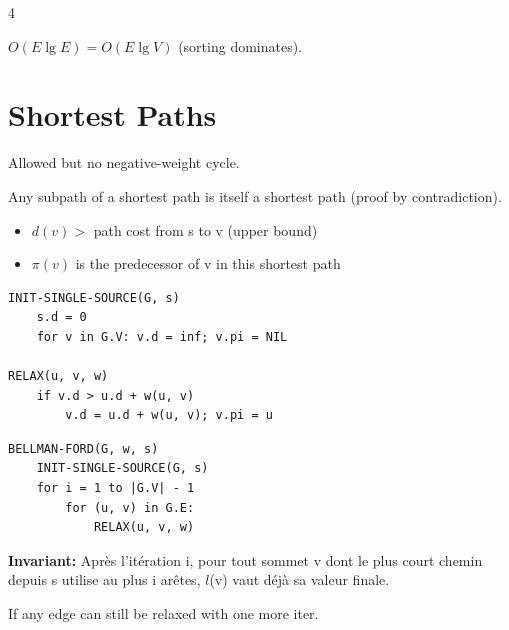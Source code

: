 \documentclass[8pt,a4paper,landscape]{extarticle}
\begin{document}
\begin{multicols*}{4}
\begin{prop}[title=Kruskal's runtime]
$O(E\lg E) = O(E\lg V)$ (sorting dominates).
\end{prop}


\section{Shortest Paths}

\begin{warn}[title=Negative weights]
Allowed but no negative-weight cycle.
\end{warn}

\begin{prop}[title=Optimal substructure]
Any subpath of a shortest path is itself a shortest path (proof by contradiction).
\end{prop}

\begin{warn}[title=Helpful tools]
\begin{itemize}
  \item $d(v) > $ path cost from s to v (upper bound)
  \item $\pi(v) $ is the predecessor of v in this shortest path
\end{itemize}
\end{warn}

\begin{lstlisting}
INIT-SINGLE-SOURCE(G, s)
    s.d = 0
    for v in G.V: v.d = inf; v.pi = NIL

RELAX(u, v, w)
    if v.d > u.d + w(u, v)
        v.d = u.d + w(u, v); v.pi = u
\end{lstlisting}

\begin{lstlisting}
BELLMAN-FORD(G, w, s)
    INIT-SINGLE-SOURCE(G, s)
    for i = 1 to |G.V| - 1
        for (u, v) in G.E: 
            RELAX(u, v, w)
\end{lstlisting}

\begin{thm}[title=Correctness]
\textbf{Invariant:} Après l'itération i, pour tout sommet v dont le plus court chemin depuis s utilise au plus i arêtes, $l$(v) vaut déjà sa valeur finale.
\end{thm}

\begin{prop}[title=Negative cycle detection]
If any edge can still be relaxed with one more iter.
\end{prop}


\end{multicols*}
\end{document}
